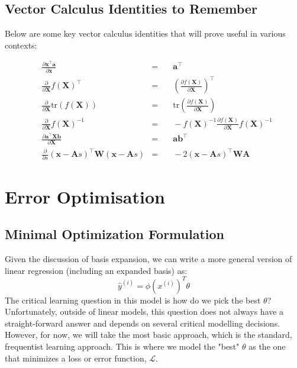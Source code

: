 \subsection{Vector Calculus Identities to Remember}

Below are some key vector calculus identities that will prove useful in various contexts:

\begin{align*}
     & \frac{\partial \bm{x}^\top \bm{a}}{\partial \bm{x}}                             & = & \quad\bm{a}^\top                                                               \\
     & \frac{\partial}{\partial \bm{X}} f(\bm{X})^\top                                 & = & \quad\left( \frac{\partial f(\bm{X})}{\partial \bm{X}} \right)^\top            \\
     & \frac{\partial}{\partial \bm{X}} \text{tr}(f(\bm{X}))                           & = & \quad\text{tr} \left( \frac{\partial f(\bm{X})}{\partial \bm{X}} \right)       \\
     & \frac{\partial}{\partial \bm{X}} f(\bm{X})^{-1}                                 & = & \quad-f(\bm{X})^{-1} \frac{\partial f(\bm{X})}{\partial \bm{X}} f(\bm{X})^{-1} \\
     & \frac{\partial \bm{a}^\top \bm{Xb}}{\partial \bm{X}}                            & = & \quad\bm{a} \bm{b}^\top                                                        \\
     & \frac{\partial}{\partial s} (\bm{x} - \bm{A} s)^\top \bm{W} (\bm{x} - \bm{A} s) & = & \quad-2 (\bm{x} - \bm{A}s)^\top \bm{W} \bm{A}
\end{align*}

\section{Error Optimisation}
\subsection{Minimal Optimization Formulation}
Given the discussion of basis expansion, we can write a more general version of linear regression (including an expanded basis) as:
\begin{equation}
    \hat{y}^{(i)} = \phi(x^{(i)})^T \theta
\end{equation}
The critical learning question in this model is how do we pick the best $\theta$?
Unfortunately, outside of linear models, this question does not always have a straight-forward answer and depends on several critical modelling decisions. However, for now, we will take the most basic approach, which is the standard, frequentist learning approach. This is where we model the "best" $\theta$ as the one that minimizes a loss or error function, $\mathcal{L}$.

